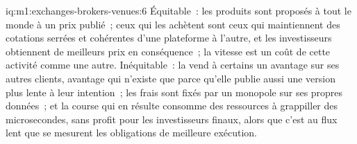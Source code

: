 \begin{solution}{iq:m1:exchanges-brokers-venues:6}
Équitable~: les produits sont proposés à tout le monde à un prix publié~; ceux qui les achètent
sont ceux qui maintiennent des cotations serrées et cohérentes d'une plateforme à l'autre, et
les investisseurs obtiennent de meilleurs prix en conséquence~; la vitesse est un coût de cette activité
comme une autre. Inéquitable~: la  vend à certains un avantage sur ses autres clients,
avantage qui n'existe que parce qu'elle publie aussi une version plus
lente à leur intention~; les frais sont fixés par un monopole sur ses propres données~; et la
course qui en résulte consomme des ressources à grappiller des microsecondes, sans profit pour
les investisseurs finaux, alors que c'est au flux lent que se mesurent les obligations de
meilleure exécution.
\end{solution}
